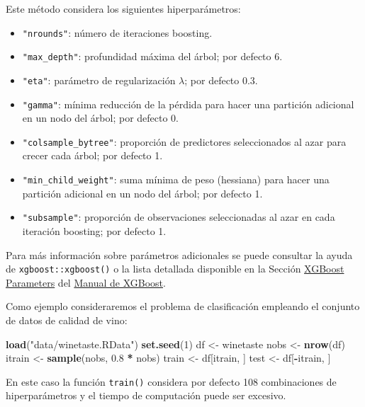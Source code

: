 \documentclass[
]{book}
\newenvironment{Shaded}{\begin{snugshade}}{\end{snugshade}}
\newcommand{\DecValTok}[1]{\textcolor[rgb]{0.00,0.00,0.81}{#1}}
\newcommand{\FloatTok}[1]{\textcolor[rgb]{0.00,0.00,0.81}{#1}}
\newcommand{\KeywordTok}[1]{\textcolor[rgb]{0.13,0.29,0.53}{\textbf{#1}}}
\newcommand{\NormalTok}[1]{#1}
\newcommand{\OperatorTok}[1]{\textcolor[rgb]{0.81,0.36,0.00}{\textbf{#1}}}
\newcommand{\StringTok}[1]{\textcolor[rgb]{0.31,0.60,0.02}{#1}}
\theoremstyle{break}
\theoremstyle{definition}
\theoremstyle{definition}
\theoremstyle{definition}
\theoremstyle{remark}
\begin{document}
Este método considera los siguientes hiperparámetros:

\begin{itemize}
\item
  \texttt{"nrounds"}: número de iteraciones boosting.
\item
  \texttt{"max\_depth"}: profundidad máxima del árbol; por defecto 6.
\item
  \texttt{"eta"}: parámetro de regularización \(\lambda\); por defecto 0.3.
\item
  \texttt{"gamma"}: mínima reducción de la pérdida para hacer una partición adicional en un nodo del árbol; por defecto 0.
\item
  \texttt{"colsample\_bytree"}: proporción de predictores seleccionados al azar para crecer cada árbol; por defecto 1.
\item
  \texttt{"min\_child\_weight"}: suma mínima de peso (hessiana) para hacer una partición adicional en un nodo del árbol; por defecto 1.
\item
  \texttt{"subsample"}: proporción de observaciones seleccionadas al azar en cada iteración boosting; por defecto 1.
\end{itemize}

Para más información sobre parámetros adicionales se puede consultar la ayuda de \texttt{xgboost::xgboost()} o la lista detallada disponible en la Sección \href{https://xgboost.readthedocs.io/en/latest/parameter.html}{XGBoost Parameters} del \href{https://xgboost.readthedocs.io}{Manual de XGBoost}.

Como ejemplo consideraremos el problema de clasificación empleando el conjunto de datos de calidad de vino:

\begin{Shaded}
\begin{Highlighting}[]
\KeywordTok{load}\NormalTok{(}\StringTok{"data/winetaste.RData"}\NormalTok{)}
\KeywordTok{set.seed}\NormalTok{(}\DecValTok{1}\NormalTok{)}
\NormalTok{df <-}\StringTok{ }\NormalTok{winetaste}
\NormalTok{nobs <-}\StringTok{ }\KeywordTok{nrow}\NormalTok{(df)}
\NormalTok{itrain <-}\StringTok{ }\KeywordTok{sample}\NormalTok{(nobs, }\FloatTok{0.8} \OperatorTok{*}\StringTok{ }\NormalTok{nobs)}
\NormalTok{train <-}\StringTok{ }\NormalTok{df[itrain, ]}
\NormalTok{test <-}\StringTok{ }\NormalTok{df[}\OperatorTok{-}\NormalTok{itrain, ]}
\end{Highlighting}
\end{Shaded}

En este caso la función \texttt{train()} considera por defecto 108 combinaciones de hiperparámetros y el tiempo de computación puede ser excesivo.
\end{document}
